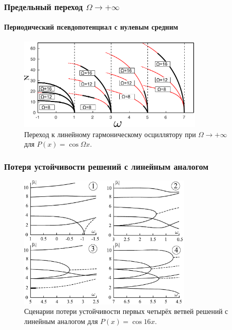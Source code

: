 \documentclass [10pt] {beamer}
\begin{document}
\begin{frame}
	\frametitle{Предельный переход $\Omega \to +\infty$}
	\framesubtitle{Периодический псевдопотенциал с нулевым средним}
	
	\begin{figure}
		\includegraphics[width=0.8\textwidth]{pic/linear_oscillator_limit.pdf}
		\caption{Переход к линейному гармоническому осциллятору при $\Omega \to +\infty$ для $P(x) = \cos \Omega x$.}
		\label{pic:linear_limit}
	\end{figure}
\end{frame}

\begin{frame}
	\frametitle{Потеря устойчивости решений с линейным аналогом}
	
	\begin{figure}
		\includegraphics[width=0.75\textwidth]{pic/stability_loss.pdf}
		\caption{Сценарии потери устойчивости первых четырёх ветвей  решений с линейным аналогом для $P(x) = \cos 16 x$.}
		\label{pic:stability_loss}
	\end{figure}
\end{frame}

\end{document}
